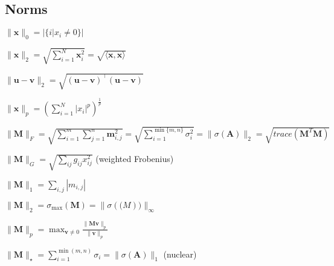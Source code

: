 \subsection*{Norms}
\begin{inparaitem}
	\item $\|\mathbf{x}\|_0 = |\{i | x_i \neq 0\}|$ \\
	\item $\|\mathbf{x}\|_2 = \sqrt{\sum_{i=1}^{N} \mathbf{x}_i^2} = \sqrt{\langle \mathbf{x}, \mathbf{x} \rangle}$ \\
	\item $\|\mathbf{u}-\mathbf{v}\|_2 = \sqrt{(\mathbf{u}-\mathbf{v})^\top(\mathbf{u}-\mathbf{v})}$ \\
	\item $\|\mathbf{x}\|_p = \left( \sum_{i=1}^{N} |x_i|^p \right)^{\frac{1}{p}}$ \\
	\item
	$\|\mathbf{M}\|_F =\allowbreak \sqrt{\sum_{i=1}^{m} \sum_{j=1}^{n}\mathbf{m}_{i,j}^2} = \sqrt{\sum_{i=1}^{\min\{m, n\}} \sigma_i^2} \allowbreak = \|\sigma(\mathbf{A})\|_2  = \sqrt{trace(\mathbf{M}^T\mathbf{M})} $\\
	\item $\|\mathbf{M}\|_G=\sqrt{\sum_{ij}{g_{ij}x^2_{ij}}}$ (weighted Frobenius) \\
	\item
	$\|\mathbf{M}\|_1 = \sum_{i,j} | m_{i,j}|$ \\
	\item $\|\mathbf{M}\|_2 = \sigma_{\text{max}}(\mathbf{M}) = \|\sigma(\mathbf(M))\|_\infty$\\
	\item $\|\mathbf{M}\|_p = \max_{\mathbf{v} \neq 0} \frac{\|\mathbf{M}\mathbf{v}\|_p}{\|\mathbf{v}\|_p}$ \\
	\item $\|\mathbf{M}\|_\star = \sum_{i=1}^{\min(m, n)} \sigma_i = \|\sigma(\mathbf{A})\|_1$ (nuclear)
\end{inparaitem}

